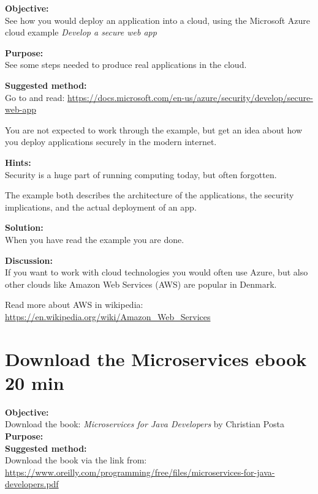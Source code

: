 \documentclass[a4paper,11pt,notitlepage]{report}
\begin{document}
{\bf Objective:}\\
See how you would deploy an application into a cloud, using the Microsoft Azure cloud example
\emph{Develop a secure web app}



{\bf Purpose:}\\
See some steps needed to produce real applications in the cloud.

{\bf Suggested method:}\\
Go to and read: \url{https://docs.microsoft.com/en-us/azure/security/develop/secure-web-app}

You are not expected to work through the example, but get an idea about how you deploy applications securely in the modern internet.

{\bf Hints:}\\
Security is a huge part of running computing today, but often forgotten.

The example both describes the architecture of the applications, the security implications, and the actual deployment of an app.

{\bf Solution:}\\
When you have read the example you are done.

{\bf Discussion:}\\
If you want to work with cloud technologies you would often use Azure, but also other clouds like Amazon Web Services (AWS) are popular in Denmark.

Read more about AWS in wikipedia:\\
\url{https://en.wikipedia.org/wiki/Amazon_Web_Services}




\chapter{Download the Microservices ebook 20 min}
\label{ex:download-microservices-book}


{\bf Objective:}\\
Download the book: \emph{Microservices for Java Developers}
by Christian Posta
{\bf Purpose:}\\

{\bf Suggested method:}\\
Download the book via the link from:\\
\url{https://www.oreilly.com/programming/free/files/microservices-for-java-developers.pdf}
\end{document}
